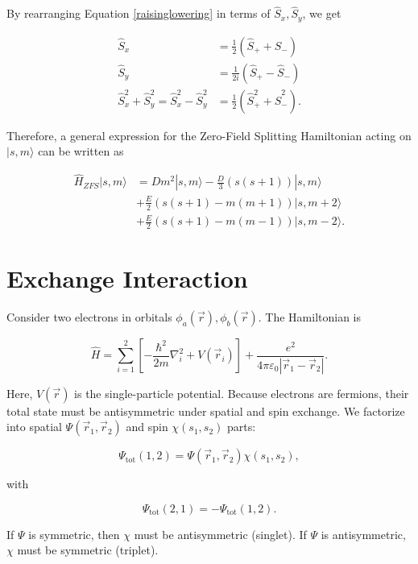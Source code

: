 \documentclass[svgnames]{article}
\begin{document}
By rearranging Equation \ref{raisinglowering} in terms of $\hat{S}_x,
\hat{S}_y$, we get 

\begin{align} \label{spinxspiny}
    \hat{S}_x &= \frac{1}{2}(\hat{S}_+ + \hat{S}_-) \\ 
    \hat{S}_y &= \frac{1}{2i}(\hat{S}_+ - \hat{S}_-) \\ 
    \hat{S}_x^2 + \hat{S}_y^2 = \hat{S}_x^2 - \hat{S}_y^2 &=
    \frac{1}{2}(\hat{S}_+^2 + \hat{S}_-^2).  
\end{align}

Therefore, a general expression for the Zero-Field Splitting Hamiltonian acting
on $|s, m\rangle$ can be written as 

\begin{purplebox}
  \begin{align*}
      \hat{H}_{ZFS} |s, m\rangle &= Dm^2 |s, m\rangle - \frac{D}{3}(s(s+1))|s,
      m\rangle \\ &+ \frac{E}{2}(s(s+1) - m(m+1))|s, m+2\rangle \\ 
                  &+ \frac{E}{2}(s(s+1) - m(m-1))|s, m-2\rangle. 
  \end{align*}
  \vspace{2px}
\end{purplebox}

\section{Exchange Interaction}

Consider two electrons in orbitals $\phi_a(\vec{r}), \phi_b(\vec{r})$. The
Hamiltonian is 

\[
\hat{H} = \sum_{i=1}^{2} \left[ -\frac{\hbar^2}{2m} \nabla_i^2 +
V(\vec{r}_i)\right] + \frac{e^2}{4\pi\varepsilon_0 |\vec{r}_1 - \vec{r}_2 |}. 
\] \vspace{3px}

Here, $V(\vec{r})$ is the single-particle potential. Because electrons are
fermions, their total state must be antisymmetric under spatial and spin
exchange. We factorize into spatial $\Psi(\vec{r}_1, \vec{r}_2)$ and spin
$\chi(s_1, s_2)$ parts: 

\[
\Psi_\text{tot} (1, 2) = \Psi(\vec{r}_1, \vec{r}_2) \chi(s_1, s_2),  
\] 

with 

\[ \Psi_\text{tot}(2, 1) = -\Psi_\text{tot}(1, 2).  \] 

If $\Psi$ is symmetric, then  $\chi$ must be antisymmetric (singlet). If $\Psi$
is antisymmetric, $\chi$ must be symmetric (triplet). \\ 
\end{document}
